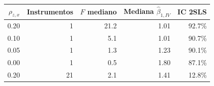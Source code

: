 \begin{tabular}{rrrrr}
\toprule
$\rho_{z,x}$ & Instrumentos & $F$ mediano & Mediana $\hat\beta_{1,IV}$ & IC 2SLS \\
\midrule
0.20 & 1 & 21.2 & 1.01 & 92.7\% \\
0.10 & 1 & 5.1 & 1.01 & 90.7\% \\
0.05 & 1 & 1.3 & 1.23 & 90.1\% \\
0.00 & 1 & 0.5 & 1.80 & 87.1\% \\
0.20 & 21 & 2.1 & 1.41 & 12.8\% \\
\bottomrule
\end{tabular}
